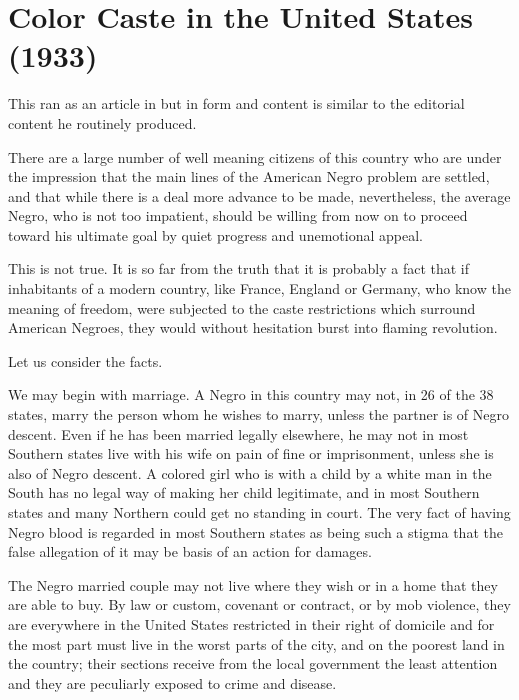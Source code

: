 \documentclass[letterpaper,10pt,english]{jupyterBook}
\begin{document}
\section{Color Caste in the United States (1933)}
\label{\detokenize{Volumes/40/03/Color_caste_in_the_united_states:color-caste-in-the-united-states-1933}}\label{\detokenize{Volumes/40/03/Color_caste_in_the_united_states::doc}}
\begin{sphinxShadowBox}
\sphinxstylesidebartitle{}

\sphinxAtStartPar
This ran as an article in  but in form and content is similar to the editorial content he routinely produced.
\end{sphinxShadowBox}

\sphinxAtStartPar
There are a large number of well meaning citizens of this country who are under the impression that the main lines of the American Negro problem are settled, and that while there is a deal more advance to be made, nevertheless, the average Negro, who is not too impatient, should be willing from now on to proceed toward his ultimate goal by quiet progress and unemotional appeal.

\sphinxAtStartPar
This is not true. It is so far from the truth that it is probably a fact that if inhabitants of a modern country, like France, England or Germany, who know the meaning of freedom, were subjected to the caste restrictions which surround American Negroes, they would without hesitation burst into flaming revolution.

\sphinxAtStartPar
Let us consider the facts.

\sphinxAtStartPar
We may begin with marriage. A Negro in this country may not, in 26 of the 38 states, marry the person whom he wishes to marry, unless the partner is of Negro descent. Even if he has been married legally elsewhere, he may not in most Southern states live with his wife on pain of fine or imprisonment, unless she is also of Negro descent. A colored girl who is with a child by a white man in the South has no legal way of making her child legitimate, and in most Southern states and many Northern could get no standing in court. The very fact of having Negro blood is regarded in most Southern states as being such a stigma that the false allegation of it may be basis of an action for damages.

\sphinxAtStartPar
The Negro married couple may not live where they wish or in a home that they are able to buy. By law or custom, covenant or contract, or by mob violence, they are everywhere in the United States restricted in their right of domicile and for the most part must live in the worst parts of the city, and on the poorest land in the country; their sections receive from the local government the least attention and they are peculiarly exposed to crime and disease.
\end{document}
